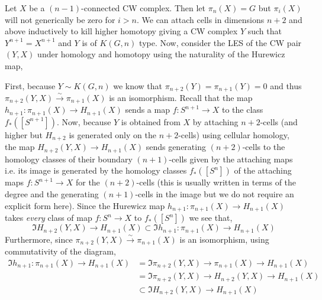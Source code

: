 \documentclass[12pt]{extarticle}
\begin{document}
Let $X$ be a $(n-1)$-connected CW complex. Then let $\pi_n(X) = G$ but $\pi_{i}(X)$ will not generically be zero for $i > n$.  We can attach cells in dimensions $n+2$ and above inductively to kill higher homotopy giving a CW complex $Y$ such that $Y^{n+1} = X^{n+1}$ and $Y$ is of $K(G, n)$ type. Now, consider the LES of the CW pair $(Y, X)$ under homology and homotopy using the naturality of the Hurewicz map,
\begin{center}
\end{center}
First, because $Y \sim K(G, n)$ we know that $\pi_{n+2}(Y) = \pi_{n+1}(Y) = 0$ and thus $\pi_{n+2}(Y, X) \xrightarrow{\sim} \pi_{n+1}(X)$ is an isomorphism. Recall that the map $h_{n+1} : \pi_{n+1}(X) \to H_{n+1}(X)$ sends a map $f : S^{n+1} \to X$ to the class $f_*([S^{n+1}])$. Now, because $Y$ is obtained from $X$ by attaching $n+2$-cells (and higher but $H_{n+2}$ is generated only on the $n+2$-cells) using cellular homology, the map $H_{n+2}(Y, X) \to H_{n+1}(X)$ sends generating $(n+2)$-cells to the homology classes of their boundary $(n+1)$-cells given by the attaching maps i.e. its image is generated by the homology classes $f_*([S^n])$ of the attaching maps $f : S^{n+1} \to X$ for the $(n+2)$-cells (this is usually written in terms of the degree and the generating $(n+1)$-cells in the image but we do not require an explicit form here). Since the Hurewicz map $h_{n+1} : \pi_{n+1}(X) \to H_{n+1}(X)$ takes \textit{every} class of map $f : S^n \to X$ to $f_*([S^n])$ we see that,
\[ \Im{H_{n+2}(Y, X) \to H_{n+1}(X)} \subset \Im{h_{n+1} : \pi_{n+1}(X) \to H_{n+1}(X)} \]
Furthermore, since $\pi_{n+2}(Y, X) \xrightarrow{\sim} \pi_{n+1}(X)$ is an isomorphism, using commutativity of the diagram,
\begin{align*}
\Im{h_{n+1} : \pi_{n+1}(X) \to H_{n+1}(X)} & = \Im{\pi_{n+2}(Y, X) \to \pi_{n+1}(X) \to H_{n+1}(X)} 
\\
& = \Im{\pi_{n+2}(Y, X) \to H_{n+2}(Y, X) \to H_{n+1}(X)}
\\
& \subset \Im{H_{n+2}(Y, X) \to H_{n+1}(X)} 
\end{align*}
\end{document}

